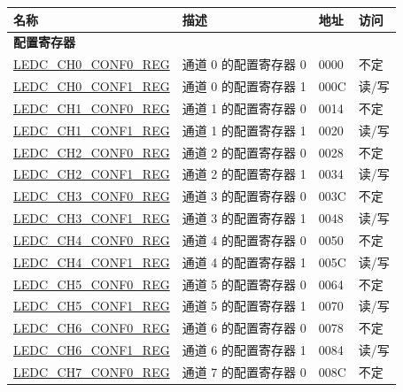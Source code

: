 \begin{longtable}{ | p{6cm} | p{7.2cm} | p{1.3cm} | p{1cm} | }
\hline\rowcolor{lightgray}
名称 & 描述 &  地址 & 访问 \\ \hline
\endhead
\multicolumn{4}{|l|}{\textbf{配置寄存器}} \\ \hline
\hyperref[regdesc:LEDCCHNCONF0REG]{LEDC\_CH0\_CONF0\_REG} & 通道 0 的配置寄存器 0 & \hexprefix{}0000 & 不定 \\ \hline
\hyperref[regdesc:LEDCCHNCONF1REG]{LEDC\_CH0\_CONF1\_REG} & 通道 0 的配置寄存器 1 & \hexprefix{}000C & 读/写 \\ \hline
\hyperref[regdesc:LEDCCHNCONF0REG]{LEDC\_CH1\_CONF0\_REG} & 通道 1 的配置寄存器 0 & \hexprefix{}0014 & 不定 \\ \hline
\hyperref[regdesc:LEDCCHNCONF1REG]{LEDC\_CH1\_CONF1\_REG} & 通道 1 的配置寄存器 1 & \hexprefix{}0020 & 读/写 \\ \hline
\hyperref[regdesc:LEDCCHNCONF0REG]{LEDC\_CH2\_CONF0\_REG} & 通道 2 的配置寄存器 0 & \hexprefix{}0028 & 不定 \\ \hline
\hyperref[regdesc:LEDCCHNCONF1REG]{LEDC\_CH2\_CONF1\_REG} & 通道 2 的配置寄存器 1 & \hexprefix{}0034 & 读/写 \\ \hline
\hyperref[regdesc:LEDCCHNCONF0REG]{LEDC\_CH3\_CONF0\_REG} & 通道 3 的配置寄存器 0 & \hexprefix{}003C & 不定 \\ \hline
\hyperref[regdesc:LEDCCHNCONF1REG]{LEDC\_CH3\_CONF1\_REG} & 通道 3 的配置寄存器 1 & \hexprefix{}0048 & 读/写 \\ \hline
\hyperref[regdesc:LEDCCHNCONF0REG]{LEDC\_CH4\_CONF0\_REG} & 通道 4 的配置寄存器 0 & \hexprefix{}0050 & 不定 \\ \hline
\hyperref[regdesc:LEDCCHNCONF1REG]{LEDC\_CH4\_CONF1\_REG} & 通道 4 的配置寄存器 1 & \hexprefix{}005C & 读/写 \\ \hline
\hyperref[regdesc:LEDCCHNCONF0REG]{LEDC\_CH5\_CONF0\_REG} & 通道 5 的配置寄存器 0 & \hexprefix{}0064 & 不定 \\ \hline
\hyperref[regdesc:LEDCCHNCONF1REG]{LEDC\_CH5\_CONF1\_REG} & 通道 5 的配置寄存器 1 & \hexprefix{}0070 & 读/写 \\ \hline
\hyperref[regdesc:LEDCCHNCONF0REG]{LEDC\_CH6\_CONF0\_REG} & 通道 6 的配置寄存器 0 & \hexprefix{}0078 & 不定 \\ \hline
\hyperref[regdesc:LEDCCHNCONF1REG]{LEDC\_CH6\_CONF1\_REG} & 通道 6 的配置寄存器 1 & \hexprefix{}0084 & 读/写 \\ \hline
\hyperref[regdesc:LEDCCHNCONF0REG]{LEDC\_CH7\_CONF0\_REG} & 通道 7 的配置寄存器 0 & \hexprefix{}008C & 不定 \\ \hline

\end{longtable}
